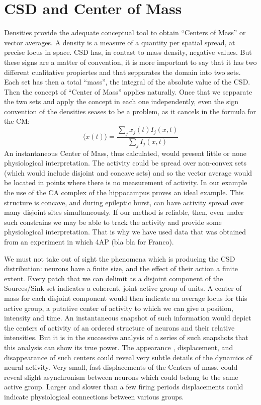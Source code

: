 \documentclass{article}
\begin{document}
 \section{CSD and Center of Mass}
 
 Densities provide the adequate conceptual tool to obtain ``Centers of Mass'' or vector averages. A density is a measure of a quantity per spatial spread, at precise locus in space. CSD has, in contast to mass density, negative values. But these signs are a matter of convention, it is more important to say that it has two different cualitative propiertes and that sepparates the domain into two sets. Each set has then a total ``mass'', the integral of the absolute value of the CSD. Then the concept of ``Center of Mass'' applies naturally. Once that we sepparate the two sets and apply the concept in each one independently, even the sign convention of the densities seases to be a problem, as it cancels in the formula for the CM:
 \begin{equation}
 \langle x(t) \rangle =\frac{\sum_j x_{j} (t) I_{j} (x,t)} {\sum_j I_{j}(x,t)}
 \end{equation}
 An instantaneous Center of Mass, thus calculated, would present little or none physiological interpretation. The activity could be spread over non-convex sets (which would include disjoint and concave sets) and so the vector average would be located in points where there is no measurement of activity. In our example the use of the CA complex of the hippocampus proves an ideal example. This structure is concave, and during epileptic burst, can have activity spread over many disjoint sites simultaneously. If our method is reliable, then, even under such constrains we may be able to track the activity and provide some physiological interpretation. That is why we have used data that was obtained from an experiment in which 4AP (bla bla for Franco).
 
 We must not take out of sight the phenomena which is producing the CSD distribution: neurons have a finite size, and the effect of their action a finite extent. Every patch that we can delimit as a disjoint component of the Sources/Sink set indicates a coherent, joint active group of units. A center of mass for each disjoint component would then indicate an average locus for this active group, a putative center of activity to which we can give a position, intensity and time. An instantaneous snapshot of such information would depict the centers of activity of an ordered structure of neurons and their relative intensities. But it is in the successive analysis of a series of such snapshots that this analysis can show its true power. The appearance , displacement, and disappearance of such centers could reveal very subtle details of the dynamics of neural activity. Very small, fast displacements of the Centers of mass, could reveal slight asynchronism between neurons which could belong to the same active group. Larger and  slower than a few firing periods displacements could indicate physiological connections between various groups.
 
\end{document}
